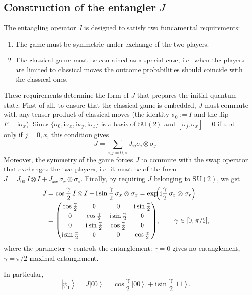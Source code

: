 \documentclass[11pt,a4paper,twoside]{article}
\newcommand{\SU}{\mathrm{SU}}
\newcommand{\mi}{\mathrm{i}} %
\newcommand{\ket}[1]{\left| #1 \right\rangle} %
\begin{document}
   \subsection{Construction of the entangler $J$}
The entangling operator $J$ is designed to satisfy two fundamental requirements:
\begin{enumerate}
\item The game must be symmetric under exchange of the two players.
\item The classical game must be contained as a special case, i.e.~when the players are limited to classical moves the outcome probabilities should coincide with the classical ones.
\end{enumerate}
These requirements determine the form of \(J\) that prepares the initial quantum state. First of all, to ensure that the classical game is embedded, \(J\) must commute with any tensor product of classical moves (the identity \(\sigma_0:=I\) and the flip \(F=\mi\sigma_x\)). Since $\{\sigma_0, \mi\sigma_x, \mi\sigma_y, \mi\sigma_z\}$ is a basis of $\SU(2)$ and $[\sigma_j,\sigma_x]=0$ if and only if $j=0,x$, this condition gives
$$J=\sum_{i,j=0,x}J_{ij}\sigma_i\otimes\sigma_j.$$ 
Moreover, the symmetry of the game forces $J$ to commute with the swap operator that exchanges the two players, i.e. it must be of the form $J=J_{00}\,I\otimes I+J_{xx}\,\sigma_x\otimes\sigma_x.$ Finally, by requiring $J$ belonging to $\SU(2)$, we get
\begin{align}\label{defJ}
J&=\cos\frac{\gamma}{2}\,I\otimes I + \mi\sin\frac{\gamma}{2}\,\sigma_x\otimes\sigma_x=\exp\!\Bigl(\mi\frac{\gamma}{2}\,\sigma_x\otimes\sigma_x\Bigr)\\
\nonumber&=\begin{pmatrix}
\cos\frac{\gamma}{2} & 0 & 0 & \mi\sin\frac{\gamma}{2}\\[2pt]
0 & \cos\frac{\gamma}{2} & \mi\sin\frac{\gamma}{2} & 0\\[2pt]
0 & \mi\sin\frac{\gamma}{2} & \cos\frac{\gamma}{2} & 0\\[2pt]
\mi\sin\frac{\gamma}{2} & 0 & 0 & \cos\frac{\gamma}{2}
\end{pmatrix},
\qquad\gamma\in[0,\pi/2],
\end{align}
where the parameter \(\gamma\) controls the entanglement: \(\gamma=0\) gives no entanglement, \(\gamma=\pi/2\) maximal entanglement.

In particular, 
\begin{equation}\label{eq:psi_1}
\ket{\psi_1}=J\ket{00}= \cos\frac{\gamma}{2}\,\ket{00}+\mi\sin\frac{\gamma}{2}\,\ket{11}.
\end{equation}
\\
\end{document}
